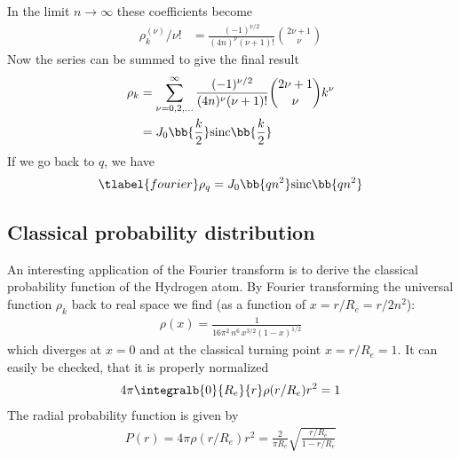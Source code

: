 In the limit $n\rightarrow \infty$ these coefficients become
\begin{align}
\rho^{(\nu)}_k/\nu! &= \frac{(-1)^{\nu/2}}{(4n)^\nu (\nu+1)!} \binom{2\nu+1}{\nu}
\end{align}
Now the series can be summed to give the final result
\begin{align}
\rho_k &= \sum_{\nu=0,2,\dots}^\infty \frac{(-1)^{\nu/2}}{(4n)^\nu (\nu+1)!} \binom{2\nu+1}{\nu} k^\nu \\
&= J_0\bb{\frac{k}{2}}\text{sinc}\bb{\frac{k}{2}}
\end{align}
If we go back to $q$, we have
\begin{align} \tlabel{fourier}
\rho_q = J_0\bb{q n^2}\text{sinc}\bb{q n^2}
\end{align}


\subsection{Classical probability distribution}
An interesting application of the Fourier transform  is to derive the classical probability function of the Hydrogen atom. By Fourier transforming the universal function $\rho_k$ back to real space we find (as a function of $x=r/R_e=r/2n^2$):
\begin{align}
\rho(x)=\frac{1}{16\pi^2\, n^6 \, x^{3/2} (1-x)^{1/2}}
\end{align}
which diverges at $x=0$ and at the classical turning point $x=r/R_e=1$. It can easily be checked, that it is properly normalized
\begin{align}
4\pi \integralb{0}{R_e}{r} \rho(r/R_e) r^2 = 1
\end{align}
The radial probability function is given by
\begin{align}
P(r)=4\pi \rho(r/R_e) r^2 = \frac{2}{\pi R_e} \sqrt{\frac{r/R_e}{1-r/R_e}}
\end{align}


